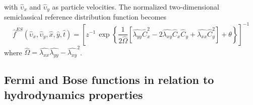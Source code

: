\documentclass{rsproca}%
\begin{document}
with $\hat{\upsilon}_x$ and $\hat{\upsilon}_y$ as particle velocities. The normalized two-dimensional semiclassical reference distribution function becomes
\begin{equation}
\hat{f}^{ES}\left(\hat{\upsilon}_x,\hat{\upsilon}_y,\hat{x},\hat{y},\hat{t}\right) =
\left[ z^{-1}\,\exp\left\{ \frac{1}{2 \hat{\Omega}} \left[ \hat{\lambda_{yy}} \hat{C}_x^2 - 2 
\hat{\lambda_{xy}} \hat{C}_x \hat{C}_y + \hat{\lambda_{xx}} \hat{C}_y^2 \right] + \theta  \right\} \right]^{-1}
\end{equation}
where $\hat{\Omega} = \hat{\lambda_{xx}} \hat{ \lambda_{yy}} - \hat{\lambda_{xy}}^2$.



\subsection{Fermi and Bose functions in relation to hydrodynamics properties}
\label{subsec:2_1}
\end{document}
